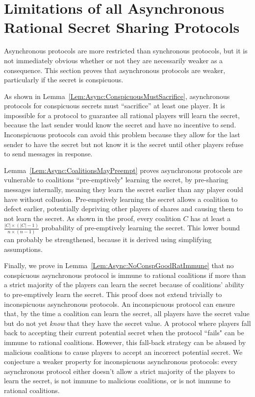 \documentclass[12pt]{dalcsthesis}
\begin{document}
\section{Limitations of all Asynchronous Rational Secret Sharing Protocols}
\label{Sec:AsympWeak}

Asynchronous protocols are more restricted than synchronous protocols, but it is not immediately obvious whether or not they are necessarily weaker as a consequence. This section proves that asynchronous protocols are weaker, particularly if the secret is conspicuous.

As shown in Lemma~\ref{Lem:Async:ConspicuousMustSacrifice}, asynchronous protocols for conspicuous secrets must ``sacrifice'' at least one player. It is impossible for a protocol to guarantee all rational players will learn the secret, because the last sender would know the secret and have no incentive to send. Inconspicuous protocols can avoid this problem because they allow for the last sender to have the secret but not know it is the secret until other players refuse to send messages in response.

Lemma~\ref{Lem:Async:CoalitionsMayPreempt} proves asynchronous protocols are vulnerable to coalitions ``pre-emptively" learning the secret, by pre-sharing messages internally, meaning they learn the secret earlier than any player could have without collusion. Pre-emptively learning the secret allows a coalition to defect earlier, potentially depriving other players of shares and causing them to not learn the secret. As shown in the proof, every coalition $C$ has at least a $\frac{|C| \times (|C| - 1)}{n \times (n-1)}$ probability of pre-emptively learning the secret. This lower bound can probably be strengthened, because it is derived using simplifying assumptions.

Finally, we prove in Lemma~\ref{Lem:Async:NoConspGoodRatImmune} that no conspicuous asynchronous protocol is immune to rational coalitions if more than a strict majority of the players can learn the secret because of coalitions' ability to pre-emptively learn the secret. This proof does not extend trivially to inconspicuous asynchronous protocols. An inconspicuous protocol can ensure that, by the time a coalition can learn the secret, all players have the secret value but do not yet \emph{know} that they have the secret value. A protocol where players fall back to accepting their current potential secret when the protocol ``fails" can be immune to rational coalitions. However, this fall-back strategy can be abused by malicious coalitions to cause players to accept an incorrect potential secret. We conjecture a weaker property for inconspicuous asynchronous protocols: every asynchronous protocol either doesn't allow a strict majority of the players to learn the secret, is not immune to malicious coalitions, or is not immune to rational coalitions.
\end{document}

